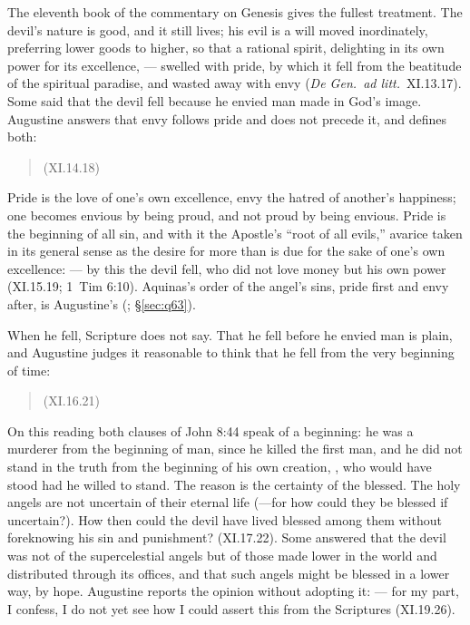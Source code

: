 The eleventh book of the commentary on Genesis gives the fullest
treatment. The devil's nature is good, and it still lives; his evil is a
will moved inordinately, preferring lower goods to higher, so that a
rational spirit, delighting in its own power for its excellence,
 --- swelled with pride, by which it
fell from the beatitude of the spiritual paradise, and wasted away with
envy (\emph{De Gen.\ ad litt.}\ XI.13.17).
Some said that the devil fell because he envied man made in God's image.
Augustine answers that envy follows pride and does not precede it, and
defines both:
\begin{quote}
 (XI.14.18)
\end{quote}
Pride is the love of one's own excellence, envy the hatred of another's
happiness; one becomes envious by being proud, and not proud by being
envious. Pride is the beginning of all sin, and with it the Apostle's
``root of all evils,'' avarice taken in its general sense as the desire
for more than is due for the sake of one's own excellence:  --- by this the devil fell, who did not love money but his
own power (XI.15.19; 1~Tim 6:10). Aquinas's order of the angel's sins,
pride first and envy after, is Augustine's (;
\S\ref{sec:q63}).

When he fell, Scripture does not say. That he fell before he envied man
is plain, and Augustine judges it reasonable to think that he fell from
the very beginning of time:
\begin{quote}
 (XI.16.21)
\end{quote}
On this reading both clauses of John 8:44 speak of a beginning: he was a
murderer from the beginning of man, since he killed the first man, and he
did not stand in the truth from the beginning of his own creation,
, who would have stood had he willed
to stand. The reason is the certainty of the blessed. The holy angels are
not uncertain of their eternal life (---for how could they be blessed if uncertain?). How then could the devil have lived blessed among them without
foreknowing his sin and punishment? (XI.17.22). Some answered that the
devil was not of the supercelestial angels but of those made lower in the
world and distributed through its offices, and that such angels might be
blessed in a lower way, by hope. Augustine reports the opinion without
adopting it:  --- for my part, I confess, I do not yet
see how I could assert this from the Scriptures (XI.19.26).

